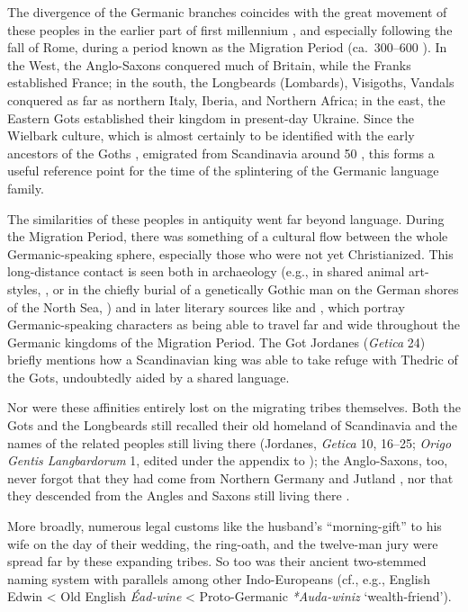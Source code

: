   The divergence of the Germanic branches coincides with the great movement of these peoples in the earlier part of first millennium \ce, and especially following the fall of Rome, during a period known as the Migration Period (ca.~300--600 \ce).  In the West, the Anglo-Saxons conquered much of Britain, while the Franks established France; in the south, the Longbeards (Lombards), Visigoths, Vandals conquered as far as northern Italy, Iberia, and Northern Africa; in the east, the Eastern Gots established their kingdom in present-day Ukraine.
  Since the Wielbark culture, which is almost certainly to be identified with the early ancestors of the Goths \parencite{McColl2024}, emigrated from Scandinavia around 50 \bce, this forms a useful reference point for the time of the splintering of the Germanic language family.

  The similarities of these peoples in antiquity went far beyond language.  During the Migration Period, there was something of a cultural flow between the whole Germanic-speaking sphere, especially those who were not yet Christianized.  This long-distance contact is seen both in archaeology (e.g., in shared animal art-styles, \cite{Salin1904}, or in the chiefly burial of a genetically Gothic man on the German shores of the North Sea, \cite{Myburgh2026}) and in later literary sources like  \parencite{Neidorf2013} and \Nornagest, which portray Germanic-speaking characters as being able to travel far and wide throughout the Germanic kingdoms of the Migration Period.  The Got Jordanes (\emph{Getica} 24) briefly mentions how a Scandinavian king was able to take refuge with Thedric of the Gots, undoubtedly aided by a shared language.

  Nor were these affinities entirely lost on the migrating tribes themselves.  Both the Gots and the Longbeards still recalled their old homeland of Scandinavia and the names of the related peoples still living there (Jordanes, \emph{Getica} 10, 16--25; \emph{Origo Gentis Langbardorum} 1, edited under the appendix to ); the Anglo-Saxons, too, never forgot that they had come from Northern Germany and Jutland \parencite{Gretzinger2022}, nor that they descended from the Angles and Saxons still living there \parencite[173--176]{Neidorf2013}.

  More broadly, numerous legal customs like the husband’s “morning-gift” to his wife on the day of their wedding, the ring-oath, and the twelve-man jury were spread far by these expanding tribes.  So too was their ancient two-stemmed naming system with parallels among other Indo-Europeans (cf., e.g., English Edwin < Old English \emph{Éad-wine} < Proto-Germanic \emph{*Auda-winiz} ‘wealth-friend’).

